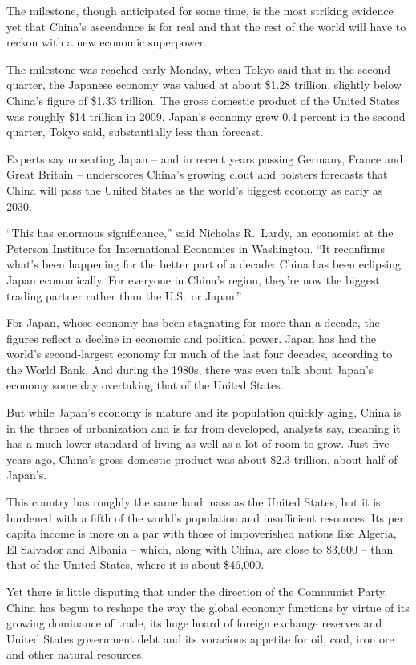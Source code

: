 ﻿\documentclass[12pt]{article}
\begin{document}
The milestone, though anticipated for some time, is the most striking evidence yet that China's
ascendance is for real and that the rest of the world will have to reckon with a new economic
superpower.

The milestone was reached early Monday, when Tokyo said that in the second quarter, the Japanese
economy was valued at about \$1.28 trillion, slightly below China's figure of \$1.33 trillion. The
gross domestic product of the United States was roughly \$14 trillion in 2009. Japan's economy grew
0.4 percent in the second quarter, Tokyo said, substantially less than forecast.

Experts say unseating Japan -- and in recent years passing Germany, France and Great Britain --
underscores China's growing clout and bolsters forecasts that China will pass the United States as
the world's biggest economy as early as 2030.

``This has enormous significance,'' said Nicholas R.~Lardy, an economist at the Peterson Institute
for International Economics in Washington. ``It reconfirms what's been happening for the better part
of a decade: China has been eclipsing Japan economically. For everyone in China's region, they're
now the biggest trading partner rather than the U.S.~or Japan.''

For Japan, whose economy has been stagnating for more than a decade, the figures reflect a decline
in economic and political power. Japan has had the world's second-largest economy for much of the
last four decades, according to the World Bank. And during the 1980s, there was even talk about
Japan's economy some day overtaking that of the United States.

But while Japan's economy is mature and its population quickly aging, China is in the throes of
urbanization and is far from developed, analysts say, meaning it has a much lower standard of living
as well as a lot of room to grow. Just five years ago, China's gross domestic product was about
\$2.3 trillion, about half of Japan's.

This country has roughly the same land mass as the United States, but it is burdened with a fifth of
the world's population and insufficient resources. Its per capita income is more on a par with those
of impoverished nations like Algeria, El Salvador and Albania -- which, along with China, are close
to \$3,600 -- than that of the United States, where it is about \$46,000.

Yet there is little disputing that under the direction of the Communist Party, China has begun to
reshape the way the global economy functions by virtue of its growing dominance of trade, its huge
hoard of foreign exchange reserves and United States government debt and its voracious appetite for
oil, coal, iron ore and other natural resources.
\end{document}
